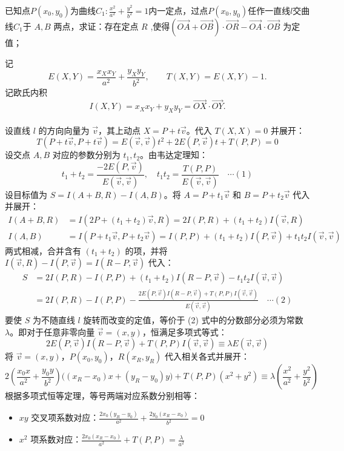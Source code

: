\begin{exercise}
    已知点$P(x_0,y_0)$为曲线$C_1:\frac{x^2}{a^2}+\frac{y^2}{b^2}=1$内一定点，过点$P(x_0,y_0)$任作一直线$l$交曲线$C_1$于 $A,B$ 两点，求证：存在定点 $R$ ,使得$(\vec{ OA}+\vec{OB})\cdot\vec{OR}-\vec{OA}\cdot\vec{ OB}$ 为定值；
\end{exercise}
\begin{solution}
记
\[
E(X,Y) = \frac{x_X x_Y}{a^2} + \frac{y_X y_Y}{b^2},\qquad T(X,Y) = E(X,Y) - 1.
\]
记欧氏内积
\[
I(X,Y) = x_X x_Y + y_X y_Y = \overrightarrow{OX} \cdot \overrightarrow{OY}.
\]
\\
设直线 $l$ 的方向向量为 $\vec{v}$，其上动点 $X = P + t\vec{v}$。代入 $T(X,X)=0$ 并展开：
$$T(P+t\vec{v}, P+t\vec{v}) = E(\vec{v},\vec{v})t^2 + 2E(P,\vec{v})t + T(P,P) = 0$$
设交点 $A, B$ 对应的参数分别为 $t_1, t_2$。由韦达定理知：
$$t_1 + t_2 = \frac{-2E(P,\vec{v})}{E(\vec{v},\vec{v})}, \quad t_1 t_2 = \frac{T(P,P)}{E(\vec{v},\vec{v})} \quad \cdots (1)$$
设目标值为 $S = I(A+B, R) - I(A, B)$。将 $A = P + t_1\vec{v}$ 和 $B = P + t_2\vec{v}$ 代入并展开：
\begin{align*}
I(A+B, R) &= I(2P + (t_1+t_2)\vec{v}, R) = 2I(P, R) + (t_1+t_2)I(\vec{v}, R)\\
I(A, B) &= I(P+t_1\vec{v}, P+t_2\vec{v}) = I(P,P) + (t_1+t_2)I(P, \vec{v}) + t_1 t_2 I(\vec{v}, \vec{v})
\end{align*}
两式相减，合并含有 $(t_1+t_2)$ 的项，并将 $I(\vec{v}, R) - I(P, \vec{v}) = I(R-P, \vec{v})$ 代入：
\begin{align*}
S &= 2I(P, R) - I(P,P) + (t_1+t_2)I(R-P, \vec{v}) - t_1 t_2 I(\vec{v}, \vec{v})\\
&= 2I(P, R) - I(P,P) - \frac{2E(P,\vec{v}) I(R-P, \vec{v}) + T(P,P) I(\vec{v}, \vec{v})}{E(\vec{v},\vec{v})} \quad \cdots (2)
\end{align*}
要使 $S$ 为不随直线 $l$ 旋转而改变的定值，等价于 (2) 式中的分数部分必须为常数 $\lambda$。即对于任意非零向量 $\vec{v} = (x, y)$，恒满足多项式等式：
$$2E(P,\vec{v}) I(R-P, \vec{v}) + T(P,P) I(\vec{v}, \vec{v}) \equiv \lambda E(\vec{v},\vec{v})$$
将 $\vec{v} = (x, y)$，$P(x_0, y_0)$，$R(x_R, y_R)$ 代入相关各式并展开：
$$2 \left( \frac{x_0 x}{a^2} + \frac{y_0 y}{b^2} \right) \big( (x_R - x_0)x + (y_R - y_0)y \big) + T(P,P)(x^2 + y^2) \equiv \lambda \left( \frac{x^2}{a^2} + \frac{y^2}{b^2} \right)$$
根据多项式恒等定理，等号两端对应系数分别相等：
\begin{itemize}
\item $xy$ 交叉项系数对应：$\frac{2x_0(y_R - y_0)}{a^2} + \frac{2y_0(x_R - x_0)}{b^2} = 0$
\item $x^2$ 项系数对应：$\frac{2x_0(x_R - x_0)}{a^2} + T(P,P) = \frac{\lambda}{a^2}$

\end{itemize}
\end{solution}
